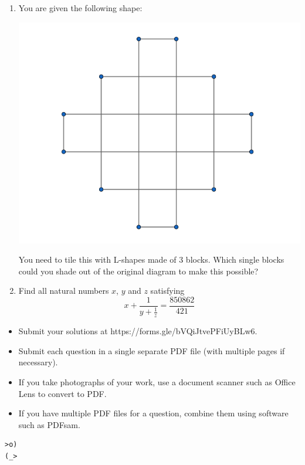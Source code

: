 \documentclass{article}
\begin{document}
\begin{enumerate}[1.]
\item You are given the following shape: %
	\begin{center}
	\includegraphics[scale=0.3]{Capture.png}	
	\end{center}
	You need to tile this with L-shapes made of 3 blocks. Which single blocks could you shade out of the original diagram to make this possible?


\item %
Find all natural numbers $x$, $y$ and $z$ satisfying 
$$x + \frac{1}{y + \frac{1}{z}} = \frac{850862}{421}$$


\end{enumerate}


\vfill
\begin{itemize}
	\item Submit your solutions at https://forms.gle/bVQiJtvePFiUyBLw6.
	\item Submit each question in a single separate PDF file (with multiple pages if necessary).
	\item If you take photographs of your work, use a document scanner such as Office Lens to convert to PDF.
	\item If you have multiple PDF files for a question, combine them using software such as PDFsam.
\end{itemize}

\vfill
\centering
\begin{BVerbatim}
>o)
(_>
\end{BVerbatim}
\end{document}
